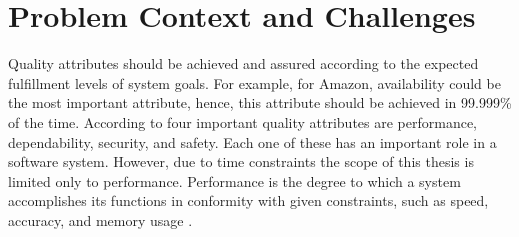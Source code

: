 

\section{Problem Context and Challenges}

Quality attributes should be achieved and assured according to the expected fulfillment levels of system goals. For example, for Amazon, availability could be the most important attribute, hence, this attribute should be achieved in 99.999\% of the time. According to \cite{barbacci1995quality} four important quality attributes are performance, dependability, security, and safety. Each one of these has an important role in a software system. However, due to time constraints the scope of this thesis is limited only to performance. Performance is the degree to which a system accomplishes its functions in conformity with given constraints, such as speed, accuracy, and memory usage \cite{barbacci1995quality}.

